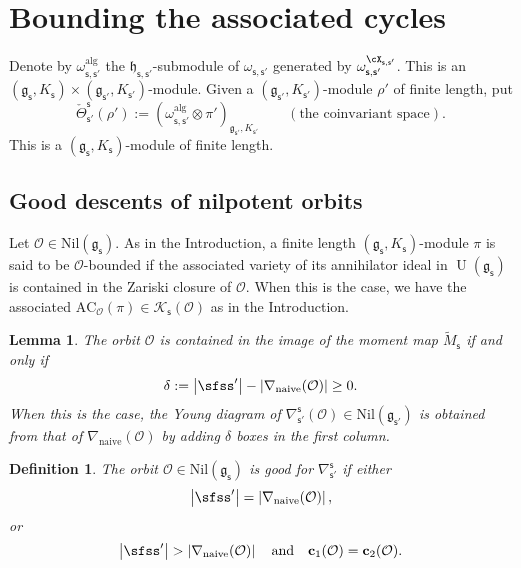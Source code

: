 \documentclass[12pt,a4paper]{amsart}
\def\abs#1{\left|{#1}\right|}
\newcommand{\CK}{{\mathcal {K}}}
\newcommand{\CO}{{\mathcal {O}}}
\newcommand{\oU}{\operatorname{U}}
\newcommand{\g}{\mathfrak g}
\newcommand{\h}{\mathfrak h}
\def\DD{\nabla}
\numberwithin{equation}{section}
\newtheorem{lem}[thm]{Lemma}
\newtheorem{defn}[thm]{Definition}
\theoremstyle{remark}
\begin{document}
\section{Bounding the associated  cycles}\label{sec:AC}


Denote by $\omega^{\mathrm{alg}}_{\mathsf s, \mathsf s'}$ the $\h_{\mathsf s, \mathsf s'}$-submodule of $\omega_{\mathsf s, \mathsf s'}$ generated by  $ \omega_{\mathsf s, \mathsf s'}^{\cX_{\mathsf s, \mathsf s'}}$. This is an $(\g_\mathsf s, K_\mathsf s)\times (\g_{\mathsf s'}, K_{\mathsf s'})$-module. Given a $ (\g_{\mathsf s'}, K_{\mathsf s'})$-module $\rho'$ of finite length, 
put
\[
   \check \Theta_{\mathsf s'}^{\mathsf s}(\rho'):=(\omega^{\mathrm{alg}}_{\mathsf s, \mathsf s'}\otimes \pi')_{\g_{\mathsf s'}, K_{\mathsf s'}} \qquad (\textrm{the  coinvariant space}).
\]
This is a $(\g_{\mathsf s}, K_{\mathsf s})$-module of finite length. 


\subsection{Good descents of nilpotent orbits}

Let $\CO\in \mathrm{Nil}(\g_\mathsf s)$. As in the Introduction, a finite length $(\g_{\mathsf s}, K_{\mathsf s})$-module $\pi$ is said to be $\CO$-bounded if the associated variety of its annihilator ideal in $\oU(\g_\mathsf s)$ is contained in the Zariski closure of $\CO$. When this is the case, we have the associated $\mathrm{AC}_{\CO}(\pi)\in  \CK_{\mathsf s}(\CO)$ as in the Introduction.



\begin{lem}
The orbit $\CO$ is contained in the image of the moment map $\tilde M_{\mathsf s}$ if and only if
\[
 \delta:=  \abs{\sfss'}-\abs{\DD_\mathrm{naive}(\CO)}\geq 0.
\]
When this is the case, the Young diagram of $\DD_{\mathsf s'}^{\mathsf s}(\CO)\in \mathrm{Nil}(\g_{\mathsf s'})$ is obtained from that of $\DD_\mathrm{naive}(\CO)$ by adding $\delta$ boxes in the first column.

\end{lem}

\begin{defn}
The orbit $\CO\in \mathrm{Nil}(\g_\mathsf s)$ is good for $\DD_{\mathsf s'}^{\mathsf s}$ if either
\[
\abs{\sfss'}=\abs{\DD_\mathrm{naive}(\CO)},
\]
or
\[
\abs{\sfss'}>\abs{\DD_\mathrm{naive}(\CO)} \quad \textrm{and}\quad  \mathbf c_1(\CO)=\mathbf c_2(\CO).
\]

\end{defn}
\end{document}
